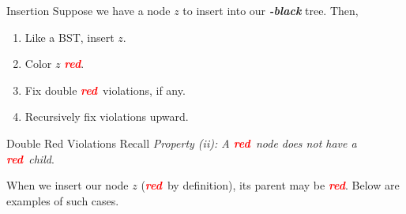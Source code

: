 \documentclass[aspectratio=169]{beamer}
\newcommand{\textib}[1]{\textit{\textbf{{#1}}}}
\newcommand{\red}{\textib{\textcolor{red}{red}}}
\begin{document}
\begin{frame}{Insertion}
    Suppose we have a node $z$ to insert into our \textib{\color{red}{red}}\textib{-black} tree. Then,
    \begin{enumerate}[label=\textit{(\roman*)}]
        \item<2-> Like a BST, insert $z$.
        \item<3-> Color $z$ \red.
        \item<4-> Fix double \red \ violations, if any.
        \item<5-> Recursively fix violations upward.
    \end{enumerate}
\end{frame}


\begin{frame}[fragile]{Double Red Violations}
    Recall \textit{Property (ii): A \red \ node does not have a \red \ child}. \vspace{1em}
    
    When we insert our node $z$ (\red \ by definition), its parent may be \red.
    Below are examples of such cases.
    \doublered
\end{frame}
\end{document}
